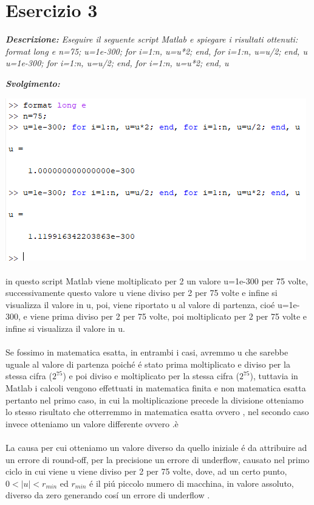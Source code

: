 \section{Esercizio 3}
\textit{\textbf{Descrizione:} Eseguire il seguente script Matlab e spiegare i risultati ottenuti:
\newline\newline		
format long e\newline
n=75;\newline
u=1e-300; for i=1:n, u=u*2; end, for i=1:n, u=u/2; end, u\newline
u=1e-300; for i=1:n, u=u/2; end, for i=1:n, u=u*2; end, u}\newline

\noindent \textit{\textbf{Svolgimento:}}\newline

\includegraphics[width=1\linewidth]{img/ex3}
\\~\\
\noindent  in questo script Matlab viene moltiplicato per 2 un valore u=1e-300 per 75 volte, successivamente questo valore u viene diviso per 2 per 75 volte e infine si visualizza il valore in u, poi, viene riportato u al valore di partenza, cio\'e u=1e-300, e viene prima diviso per 2 per 75 volte, poi moltiplicato per 2 per 75 volte  e infine si visualizza il valore in u.
\\~\\
\noindent Se fossimo in matematica esatta, in entrambi i casi, avremmo u che sarebbe uguale al valore di partenza poich\'e \'e stato prima moltiplicato e diviso per la stessa cifra ($2^{75}$) e poi diviso e moltiplicato per la stessa cifra ($2^{75}$), tuttavia in Matlab i calcoli vengono effettuati in matematica finita e non matematica esatta pertanto nel primo caso, in cui la moltiplicazione precede la divisione otteniamo lo stesso risultato che otterremmo in matematica esatta ovvero , nel secondo caso invece otteniamo un valore differente ovvero .è
\\~\\
\noindent La causa per cui otteniamo un valore diverso da quello iniziale \'e da attribuire ad un errore di round-off, per la precisione un errore di underflow, causato nel primo ciclo in cui viene u viene diviso per 2 per 75 volte, dove, ad un certo punto, $0 < \left | u \right |< r_{min}$ ed $ r_{min}$ \'e il pi\'u piccolo numero di macchina, in valore assoluto, diverso da zero generando cos\'i un errore di underflow .
\newline
\newline